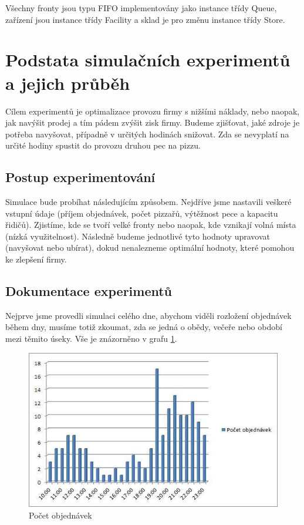 \documentclass[a4paper, 12pt]{article}[9.12.2013]
\begin{document}
Všechny fronty jsou typu FIFO implementovány jako instance třídy Queue, zařízení jsou instance třídy
Facility a sklad je pro změnu instance třídy Store.


\section{Podstata simulačních experimentů a jejich průběh} \label{experimenty}
Cílem experimentů je optimalizace provozu firmy s nižšími náklady, nebo naopak,
jak navýšit prodej a tím pádem zvýšit zisk firmy. Budeme zjišťovat, jaké zdroje
je potřeba navyšovat, případně v určitých hodinách snižovat. Zda se nevyplatí
na určité hodiny spustit do provozu druhou pec na pizzu.

\subsection{Postup experimentování} \label{experimenty:postup}
Simulace bude probíhat následujícím způsobem. Nejdříve jsme nastavili veškeré
vstupní údaje (příjem objednávek, počet pizzařů, výtěžnost pece a kapacitu
řidičů). Zjistíme, kde se tvoří velké fronty nebo naopak, kde vznikají volná
místa (nízká využitelnost). Následně budeme jednotlivé tyto hodnoty upravovat
(navyšovat nebo ubírat), dokud nenalezneme optimální hodnoty, které pomohou ke
zlepšení firmy.

\subsection{Dokumentace experimentů} \label{experimenty:dokumentace}
Nejprve jsme provedli simulaci celého dne, abychom viděli rozložení objednávek
během dny, musíme totiž zkoumat, zda se jedná o obědy, večeře nebo období mezi
těmito úseky. Vše je znázorněno v grafu \ref{fig:1}.

\begin{figure}[h]
    \centering
    \includegraphics[width=\textwidth,height=\textheight,keepaspectratio]{1.jpg}
    \caption{Počet objednávek}
    \label{fig:1}
\end{figure}
\end{document}
